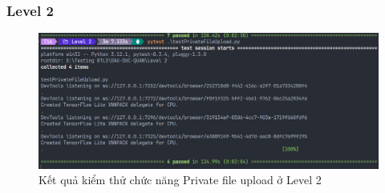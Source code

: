 \subsubsection{Level 2}
\begin{figure}[H]
    \centering
    \includegraphics[width=0.8\linewidth]{image/pf_lv2.png}
    \caption{Kết quả kiểm thử chức năng Private file upload ở Level 2}
\end{figure}

